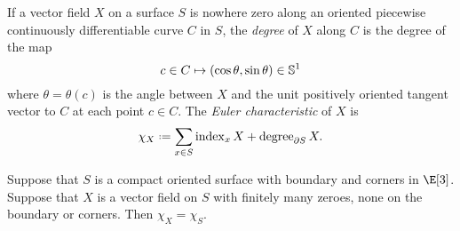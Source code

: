 If a vector field \(X\) on a surface \(S\) is nowhere zero along an oriented piecewise continuously differentiable curve \(C\) in \(S\), the \emph{degree} of \(X\) along \(C\) is the degree of the map
\[
c \in C \mapsto \left(\cos \theta, \sin \theta\right) \in \mathbb{S}^1
\]
where \(\theta=\theta(c)\) is the angle between \(X\) and the unit positively oriented tangent vector to \(C\) at each point \(c \in C\).
The \emph{Euler characteristic} of \(X\) is
\[
\chi_X\defeq \sum_{x \in S} \operatorname{index}_x X 
+ \operatorname{degree}_{\partial S} X.
\]
\begin{theorem}
Suppose that \(S\) is a compact oriented surface with boundary and corners in \(\E[3]\).
Suppose that \(X\) is a vector field on \(S\) with finitely many zeroes, none on the boundary or corners.
Then \(\chi_X=\chi_S\).
\end{theorem}

